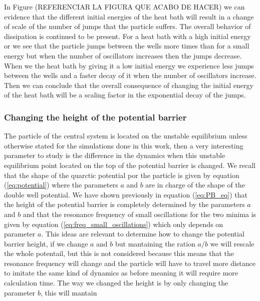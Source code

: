 In Figure (REFERENCIAR LA FIGURA QUE ACABO DE HACER) we can evidence that the different initial energies of the heat bath will result in a change of scale of the number of jumps that the particle suffers. The overall behavior of dissipation is continued to be present. For a heat bath with a high initial energy or  we see that the particle jumps between the wells more times than for a small energy but when the number of oscillators increases then the jumps decrease. When we  the heat bath by giving it a low initial energy we experience less jumps between the wells and a faster decay of it when the number of oscillators increase. Then we can conclude that the overall consequence of changing the initial energy of the heat bath will be a scaling factor in the exponential decay of the jumps.



\subsubsection{Changing the height of the potential barrier}
The particle of the central system is located on the unstable equilibrium unless otherwise stated for the simulations done in this work, then a very interesting parameter to study is the difference in the dynamics when this unstable equilibrium point located on the top of the potential barrier is changed. We recall that the shape of the quarctic potential por the particle is given by equation (\ref{eq:potential}) where the parameters $a$ and $b$ are in charge of the shape of the double well potential. We have shown previously in equation (\ref{eq:PB_eq}) that the height of the potential barrier is completely determined by the parameters $a$ and $b$ and that the resonance frequency of small oscillations for the two minima is given by equation (\ref{eq:freq_small_oscillations}) which only depends on parameter $a$. This ideas are relevant to determine how to change the potential barrier height, if we change $a$ and $b$ but mantaining the ration $a/b$ we will rescale the whole potentail, but this is not considered because this means that the resonance frequency will change and the particle will have to travel more distance to imitate the same kind of dynamics as before meaning it will require more calculation time. The way we changed the height is by only changing the parameter $b$, this will mantain 






